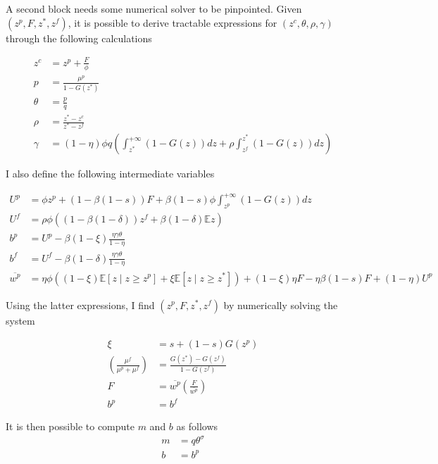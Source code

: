A second block needs some numerical solver to be pinpointed. Given $\left( z^p, F, z^*, z^f\right)$, it is possible to derive tractable expressions for $\left( z^c, \theta, \rho, \gamma \right)$ through the following calculations

\begin{align*}
z^c &= z^p + \frac{F}{\phi}\\
p &= \frac{\mu^p}{1-G\left( z^*\right)}\\
\theta &= \frac{p}{q}\\
\rho &= \frac{z^* - z^c}{z^* - z^f}\\
\gamma &= (1-\eta) \phi q \left( \int_{z^*}^{+\infty} \left( 1 - G(z) \right) dz + \rho \int_{z^f}^{z^*} \left( 1 - G(z) \right) dz \right)
\end{align*}

I also define the following intermediate variables

\begin{align*}
U^p &= \phi z^p + (1-\beta (1-s) )F + \beta (1-s) \phi \int_{z^p}^{+\infty} \left( 1- G(z) \right) dz\\
U^f &= \rho \phi \left( (1-\beta (1-\delta)) z^f + \beta (1-\delta) \mathbb{E}z \right)\\
b^p &= U^p - \beta (1-\xi) \frac{\eta \gamma \theta}{1-\eta}\\
b^f &= U^f - \beta (1-\delta) \frac{\eta \gamma \theta}{1-\eta}\\
\overline{w^p} &= \eta \phi \left( (1-\xi) \mathbb{E} \left[ z \mid z \geq z^p \right] + \xi \mathbb{E} \left[ z \mid z \geq z^* \right]\right) + (1-\xi) \eta F - \eta \beta (1-s) F + (1-\eta) U^p
\end{align*}

Using the latter expressions, I find $\left( z^p, F, z^*, z^f\right)$ by numerically solving the system

\begin{align*}
\xi &= s+(1-s)G\left(z^p\right)\\
\left( \frac{\mu^f}{\mu^p+\mu^f} \right) &= \frac{G\left( z^* \right) - G\left( z^f \right)}{1 - G\left( z^f \right)}\\
F &= \overline{w^p} \left( \frac{F}{\overline{w^p}} \right)\\
b^p &= b^f
\end{align*}

It is then possible to compute $m$ and $b$ as follows
\begin{align*}
m &= q \theta^{\sigma}\\
b &= b^p
\end{align*}

